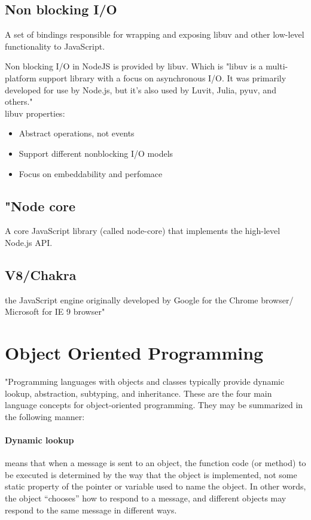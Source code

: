 \documentclass{llncs}
\begin{document}
\subsection{Non blocking I/O}
A set of bindings responsible for wrapping and exposing libuv and other low-level functionality to JavaScript.\cite{nodejsbook}

Non blocking I/O in NodeJS is provided by libuv\cite{nodejsabout}\cite{nodejsbook}. 
Which is "libuv is a multi-platform support library with a focus on asynchronous I/O. It was primarily developed for use by Node.js, but it’s also used by Luvit, Julia, pyuv, and others."\cite{libuv}\\
libuv properties\cite{libuvBasic}:
\begin{itemize}
\item Abstract operations, not events
\item Support different nonblocking I/O models
\item Focus on embeddability and perfomace
\end{itemize}


\subsection{"Node core}
A core JavaScript library (called node-core) that implements the high-level Node.js API.

\subsection{V8/Chakra} the JavaScript engine originally developed by Google for the Chrome browser/ Microsoft for IE 9 browser"\cite{nodejsbook} 

\section{Object Oriented Programming}
"Programming languages with objects and classes typically provide dynamic lookup, abstraction, subtyping, and inheritance. These are the four main language concepts for object-oriented programming. They may be summarized in the following manner:
\paragraph{Dynamic lookup} means that when a message is sent to an object, the function code (or method) to be executed is determined by the way that the object is implemented, not some static property of the pointer or variable used to name the object. In other words, the object “chooses” how to respond to a message, and different objects may respond to the same message in different ways.
\end{document}
